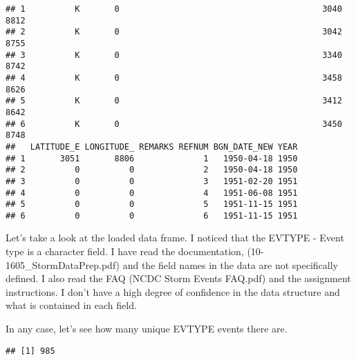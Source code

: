 \documentclass[
]{article}
\newenvironment{Shaded}{\begin{snugshade}}{\end{snugshade}}
\newcommand{\CommentTok}[1]{\textcolor[rgb]{0.56,0.35,0.01}{\textit{#1}}}
\newcommand{\FunctionTok}[1]{\textcolor[rgb]{0.00,0.00,0.00}{#1}}
\newcommand{\NormalTok}[1]{#1}
\newcommand{\OtherTok}[1]{\textcolor[rgb]{0.56,0.35,0.01}{#1}}
\newcommand{\SpecialCharTok}[1]{\textcolor[rgb]{0.00,0.00,0.00}{#1}}
\begin{document}
\begin{verbatim}
## 1          K       0                                         3040      8812
## 2          K       0                                         3042      8755
## 3          K       0                                         3340      8742
## 4          K       0                                         3458      8626
## 5          K       0                                         3412      8642
## 6          K       0                                         3450      8748
##   LATITUDE_E LONGITUDE_ REMARKS REFNUM BGN_DATE_NEW YEAR
## 1       3051       8806              1   1950-04-18 1950
## 2          0          0              2   1950-04-18 1950
## 3          0          0              3   1951-02-20 1951
## 4          0          0              4   1951-06-08 1951
## 5          0          0              5   1951-11-15 1951
## 6          0          0              6   1951-11-15 1951
\end{verbatim}

\begin{Shaded}
\end{Shaded}

Let's take a look at the loaded data frame. I noticed that the EVTYPE -
Event type is a character field. I have read the documentation,
(10-1605\_StormDataPrep.pdf) and the field names in the data are not
specifically defined. I also read the FAQ (NCDC Storm Events FAQ.pdf)
and the assignment instructions. I don't have a high degree of
confidence in the data structure and what is contained in each field.

In any case, let's see how many unique EVTYPE events there are.

\begin{Shaded}
\end{Shaded}

\begin{verbatim}
## [1] 985
\end{verbatim}
\end{document}
